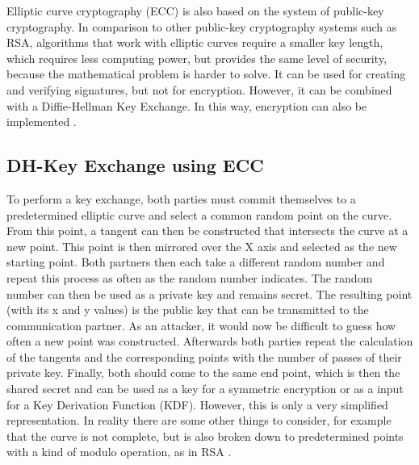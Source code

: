 \documentclass[12pt,oneside,a4paper,parskip]{scrbook}
\begin{document}
Elliptic curve cryptography (ECC) is also based on the system of public-key cryptography. In comparison to other public-key cryptography systems such as RSA, algorithms that work with elliptic curves require a smaller key length, which requires less computing power, but provides the same level of security, because the mathematical problem is harder to solve. It can be used for creating and verifying signatures, but not for encryption. However, it can be combined with a Diffie-Hellman Key Exchange. In this way, encryption can also be implemented \parencite{sullivan_relatively_2013}.

\subsection{DH-Key Exchange using ECC}
To perform a key exchange, both parties must commit themselves to a predetermined elliptic curve and select a common random point on the curve. From this point, a tangent can then be constructed that intersects the curve at a new point. This point is then mirrored over the X axis and selected as the new starting point. Both partners then each take a different random number and repeat this process as often as the random number indicates. The random number can then be used as a private key and remains secret. The resulting point (with its x and y values) is the public key that can be transmitted to the communication partner. As an attacker, it would now be difficult to guess how often a new point was constructed. Afterwards both parties repeat the calculation of the tangents and the corresponding points with the number of passes of their private key. Finally, both should come to the same end point, which is then the shared secret and can be used as a key for a symmetric encryption or as a input for a Key Derivation Function (KDF). However, this is only a very simplified representation. In reality there are some other things to consider, for example that the curve is not complete, but is also broken down to predetermined points with a kind of modulo operation, as in RSA \parencite{sullivan_relatively_2013}.
\end{document}

